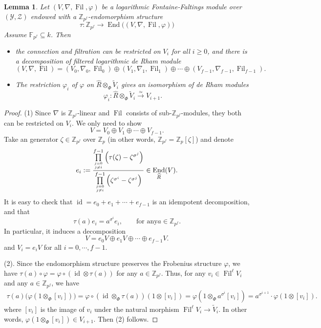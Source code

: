 \documentclass[12pt,twoside]{book}
\theoremstyle{plain}
\newtheorem{lemma}[lemma]{Lemma}
\theoremstyle{definition}
\theoremstyle{remark}
\newcommand{\bF}{{\mathbb F}}
\newcommand{\bZ}{{\mathbb Z}}
\newcommand{\mY}{{\mathcal Y}}
\newcommand{\mZ}{{\mathcal Z}}
\DeclareMathOperator\End{End}
\DeclareMathOperator\Fil{Fil}
\DeclareMathOperator\id{id}
\numberwithin{equation}{section}
\begin{document}
\begin{lemma} Let $(V,\nabla,\Fil,\varphi)$ be a logarithmic Fontaine-Faltings module over $(\mY,\mZ)$ endowed with a $\bZ_{p^f}$-endomorphism structure
\[\tau\colon \bZ_{p^f} \rightarrow \End\big((V,\nabla,\Fil,\varphi)\big)\]
Assume $\bF_{p^f}\subseteq k$. Then
\begin{itemize}
\item[$(1)$] the connection and filtration can be restricted on $V_i$ for all $i\geq0$, and there is a decomposition of filtered logarithmic de Rham module
\[(V,\nabla,\Fil) = (V_0,\nabla_0,\Fil_0) \oplus (V_1,\nabla_1,\Fil_1) \oplus \cdots \oplus (V_{f-1},\nabla_{f-1},\Fil_{f-1}).\]
\item[$(2)$] The restriction $\varphi_i$ of $\varphi$ on $\widehat{R}\otimes_{\Phi}\widetilde{V}_i$ gives an isomorphism of de Rham modules
\[\varphi_i\colon \widehat{R} \otimes_{\Phi} \widetilde{V}_i \overset{\simeq}{\longrightarrow} V_{i+1}.\]
\end{itemize}
\end{lemma}

\begin{proof} (1) Since $\nabla$ is $\bZ_{p^f}$-linear and $\Fil$ consists of sub-$\bZ_{p^f}$-modules, they both can be restricted on $V_i$. We only need to show
\[V=V_0\oplus V_1 \oplus \cdots \oplus V_{f-1}.\]
Take an generator $\zeta\in \bZ_{p^f}$ over $\bZ_p$ (in other words, $\bZ_{p^f}=\bZ_{p}[\zeta]$) and denote
\[e_i:= \frac{\prod\limits_{j=0\atop j\neq i}^{f-1}\Big(\tau(\zeta)-\zeta^{\sigma^j}\Big)}{\prod\limits_{j=0\atop j\neq i}^{f-1}\Big(\zeta^{\sigma^i}-\zeta^{\sigma^j}\Big)}\in \End_{\widehat{R}}(V).\]
It is easy to check that $\id=e_0+e_1+\cdots+e_{f-1}$ is an idempotent decomposition, and that
\[\tau(a) e_i=a^{\sigma^i} e_i,\qquad \text{for any} a\in \bZ_{p^f}.\]
In particular, it induces a decomposition
\[V = e_0V \oplus e_1V \oplus \cdots \oplus e_{f-1}V.\]
and $V_i = e_iV$ for all $i=0,\cdots,f-1$.

(2). Since the endomorphism structure preserves the Frobenius structure $\varphi$, we have $\tau(a)\circ\varphi = \varphi\circ(\id\otimes\tau(a))$ for any $a\in\bZ_{p^f}$. Thus, for any $v_i\in \Fil^\ell V_i$ and any $a\in\bZ_{p^f}$, we have
\begin{equation*}
\begin{split}
\tau(a)\big(\varphi(1\otimes_\Phi [v_i])\big)= \varphi\circ(\id\otimes_\Phi \tau(a)) (1\otimes[v_i]) = \varphi(1\otimes_\Phi a^{\sigma^i}[v_i])= a^{\sigma^{i+1}} \cdot \varphi(1\otimes[v_i]).
\end{split}
\end{equation*}
where $[v_i]$ is the image of $v_i$ under the natural morphism $\Fil^\ell V_i \rightarrow \widetilde{V}_i$.
In other words, $\varphi(1\otimes_{\Phi}[v_i])\in V_{i+1}$. Then (2) follows.
\end{proof}
\end{document}
